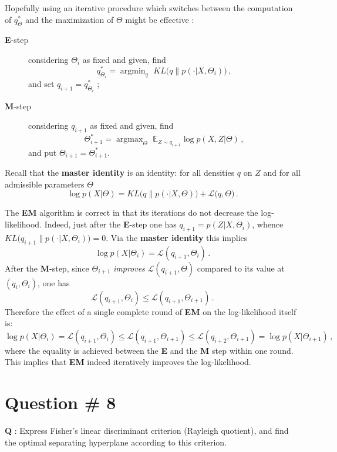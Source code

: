 \documentclass[a4paper]{article}
\newcommand{\argmin}{\mathop{\text{argmin}}}
\newcommand{\argmax}{\mathop{\text{argmax}}}
\begin{document}
Hopefully using an iterative procedure which switches between the computation of $q^*_\Theta$
and the maximization of $\Theta$ might be effective : \begin{description}
	\item[\textbf{E}-step] considering $\Theta_i$ as fixed and given, find
	\[ q^*_{\Theta_i} = \argmin_q \,\, KL\bigl(q\|p(\cdot|X,\Theta_i)\bigr)\,,\]
	and set $q_{i+1} = q^*_{\Theta_i}$ ;
	\item[\textbf{M}-step] considering $q_{i+1}$ as fixed and given, find
	\[ \Theta^*_{i+1} = \argmax_\Theta \,\, \mathbb{E}_{Z\sim q_{i+1}} \log p(X,Z|\Theta)\,,\]
	and put $\Theta_{i+1} = \Theta^*_{i+1}$.
\end{description}

Recall that the \textbf{master identity} is an identity: for all densities $q$ on
$Z$ and for all admissible parameters $\Theta$
\[ \log p(X|\Theta) = KL\bigl(q\|p(\cdot|X,\Theta)\bigr) + \mathcal{L}\bigl(q, \Theta\bigr) \,. \]

The \textbf{EM} algorithm is correct in that its iterations do not decrease the
log-likelihood. Indeed, just after the \textbf{E}-step one has $q_{i+1} = p(Z|X,\Theta_i)$,
whence $KL\bigl(q_{i+1}\|p(\cdot|X,\Theta_i)\bigr) = 0$. Via the \textbf{master identity}
this implies
\[ \log p(X|\Theta_i) = \mathcal{L}(q_{i+1},\Theta_i) \,. \]
After the \textbf{M}-step, since $\Theta_{i+1}$ \emph{improves} $\mathcal{L}(q_{i+1},\Theta)$
compared to its value at $(q_i,\Theta_i)$, one has
\[ \mathcal{L}(q_{i+1},\Theta_i) \leq \mathcal{L}(q_{i+1},\Theta_{i+1}) \,. \]
Therefore the effect of a single complete round of \textbf{EM} on the log-likelihood
itself is:
\[
\log p(X|\Theta_i)
= \mathcal{L}(q_{i+1},\Theta_i)
\leq \mathcal{L}(q_{i+1},\Theta_{i+1})
\leq \mathcal{L}(q_{i+2},\Theta_{i+1})
= \log p(X|\Theta_{i+1}) \,,
\]
where the equality is achieved between the \textbf{E} and the \textbf{M} step within one round.
This implies that \textbf{EM} indeed iteratively improves the log-likelihood.

\clearpage

\section[Fisher's LDA]{Question \# 8} %
\label{sec:question_8}
\textbf{\large \textbf{Q}} : Express Fisher's linear discriminant criterion (Rayleigh
quotient), and find the optimal separating hyperplane according to this criterion.
\end{document}
